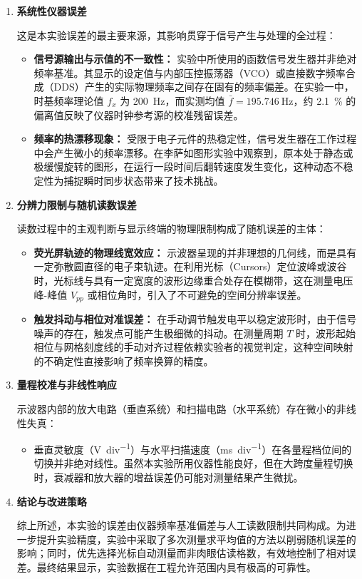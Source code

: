 \documentclass[]{../template/Report}%
\begin{document}
\begin{enumerate}
    \item \textbf{系统性仪器误差}

    这是本实验误差的最主要来源，其影响贯穿于信号产生与处理的全过程：
    \begin{itemize}
        \item \textbf{信号源输出与示值的不一致性：} 实验中所使用的函数信号发生器并非绝对频率基准。其显示的设定值与内部压控振荡器（VCO）或直接数字频率合成（DDS）产生的实际物理频率之间存在固有的频率偏差。在实验一中，时基频率理论值 $f_x$ 为 \SI{200}{\hertz}，而实测均值 $\bar{f} = \SI{195.746}{\hertz}$，约 \SI{2.1}{\percent} 的偏离值反映了仪器时钟参考源的校准残留误差。
        \item \textbf{频率的热漂移现象：} 受限于电子元件的热稳定性，信号发生器在工作过程中会产生微小的频率漂移。在李萨如图形实验中观察到，原本处于静态或极缓慢旋转的图形，在运行一段时间后翻转速度发生变化，这种动态不稳定性为捕捉瞬时同步状态带来了技术挑战。
    \end{itemize}

    \item \textbf{分辨力限制与随机读数误差}

    读数过程中的主观判断与显示终端的物理限制构成了随机误差的主体：
    \begin{itemize}
        \item \textbf{荧光屏轨迹的物理线宽效应：} 示波器呈现的并非理想的几何线，而是具有一定弥散圆直径的电子束轨迹。在利用光标（Cursors）定位波峰或波谷时，光标线与具有一定宽度的波形边缘重合处存在模糊带，这在测量电压峰-峰值 $V_{pp}$ 或相位角时，引入了不可避免的空间分辨率误差。
        \item \textbf{触发抖动与相位对准误差：} 在手动调节触发电平以稳定波形时，由于信号噪声的存在，触发点可能产生极细微的抖动。在测量周期 $T$ 时，波形起始相位与网格刻度线的手动对齐过程依赖实验者的视觉判定，这种空间映射的不确定性直接影响了频率换算的精度。
    \end{itemize}

    \item \textbf{量程校准与非线性响应}

    示波器内部的放大电路（垂直系统）和扫描电路（水平系统）存在微小的非线性失真：
    \begin{itemize}
        \item 垂直灵敏度（\si{\volt\per div}）与水平扫描速度（\si{\ms\per div}）在各量程档位间的切换并非绝对线性。虽然本实验所用仪器性能良好，但在大跨度量程切换时，衰减器和放大器的增益误差仍可能对测量结果产生微扰。
    \end{itemize}

    \item \textbf{结论与改进策略}

    综上所述，本实验的误差由仪器频率基准偏差与人工读数限制共同构成。为进一步提升实验精度，实验中采取了多次测量求平均值的方法以削弱随机误差的影响；同时，优先选择光标自动测量而非肉眼估读格数，有效地控制了相对误差。最终结果显示，实验数据在工程允许范围内具有极高的可靠性。

\end{enumerate}
\end{document}
